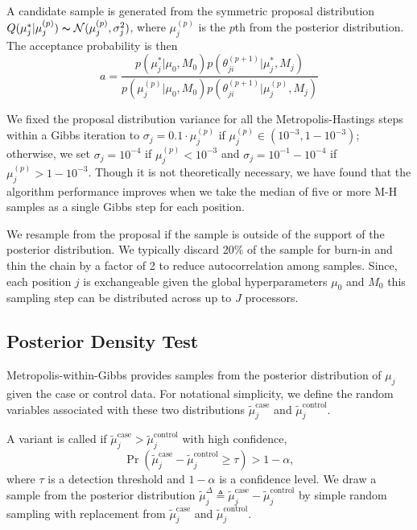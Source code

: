 \documentclass[11pt,reqno]{amsart}
\begin{document}
A candidate sample is generated from the symmetric proposal distribution $Q(\mu_j^* | \mu_j^{(p)}) \thicksim \mathcal{N}(\mu_j^{(p)}, \sigma_j^2)$, where $\mu_j^{(p)}$ is the $p$th from the posterior distribution. The acceptance probability is then
\begin{equation}
	a = \frac{ p(\mu_j^* | \mu_0, M_0) p(\theta^{(p+1)}_{ji} | \mu_j^*, M_j) } {p(\mu_j^{(p)} | \mu_0, M_0) p(\theta^{(p+1)}_{ji} | \mu_j^{(p)}, M_j)}
\end{equation}

We fixed the proposal distribution variance for all the Metropolis-Hastings steps within a Gibbs iteration to $\sigma_j = 0.1 \cdot \mu_j^{(p)}$ if $\mu_j^{(p)} \in (10^{-3},1-10^{-3})$; otherwise, we set $\sigma_j = 10^{-4}$ if $\mu_j^{(p)}< 10^{-3}$ and $\sigma_j = 10^{-1}-10^{-4}$ if $\mu_j^{(p)}>1-10^{-3}$. Though it is not theoretically necessary, we have found that the algorithm performance improves when we take the median of five or more M-H samples as a single Gibbs step for each position. 


We resample from the proposal if the sample is outside of the support of the posterior distribution. We typically discard 20\% of the sample for burn-in and thin the chain by a factor of 2 to reduce autocorrelation among samples. Since, each position $j$ is exchangeable given the global hyperparameters $\mu_0$ and $M_0$ this sampling step can be distributed across up to $J$ processors. 

\subsection{Posterior Density Test}\label{sec:hypothesis_test}
Metropolis-within-Gibbs provides samples from the posterior distribution of $\mu_j$ given the case or control data. For notational simplicity, we define the random variables associated with these two distributions $\tilde{\mu}_j^{\text{case}}$ and $\tilde{\mu}_j^{\text{control}}$.

A variant is called if $\tilde{\mu}_j^{\text{case}} > \tilde{\mu}_j^{\text{control}}$ with high confidence,
\begin{equation}\label{eqn:bayes_test}
	\Pr( \tilde{\mu}_j^{\text{case}} - \tilde{\mu}_j^{\text{control}} \geq \tau ) > 1-\alpha,
\end{equation}
where $\tau$ is a detection threshold and $1-\alpha$ is a confidence level. We draw a sample from the posterior distribution $\tilde{\mu}_j^{\Delta} \triangleq \tilde{\mu}_j^{\text{case}} - \tilde{\mu}_j^{\text{control}}$ by simple random sampling with replacement from $\tilde{\mu}_j^{\text{case}}$ and $\tilde{\mu}_j^{\text{control}}$.
\end{document}
